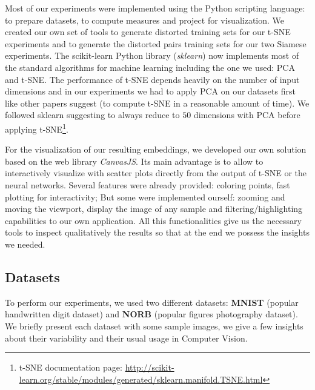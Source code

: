 \documentclass[a4paper,12pt]{report}
\begin{document}
Most of our experiments were implemented using the Python scripting language: to prepare datasets, to compute measures and project for visualization.
We created our own set of tools to generate distorted training sets for our t-SNE experiments and to generate the distorted pairs training sets for our two Siamese experiments.
The scikit-learn Python library ({\em sklearn}) now implements most of the standard algorithms for machine learning including the one we used: PCA and t-SNE\cite{pedregosa2011scikit}.
The performance of t-SNE depends heavily on the number of input dimensions and in our experiments we had to apply PCA on our datasets first like other papers suggest\cite{t-SNE} (to compute t-SNE in a reasonable amount of time).
We followed sklearn suggesting to always reduce to $50$ dimensions with PCA before applying t-SNE\footnote{t-SNE documentation page: \url{http://scikit-learn.org/stable/modules/generated/sklearn.manifold.TSNE.html}}.

For the visualization of our resulting embeddings, we developed our own solution based on the web library {\em CanvasJS}.
Its main advantage is to allow to interactively visualize with scatter plots directly from the output of t-SNE or the neural networks.
Several features were already provided: coloring points, fast plotting for interactivity; But some were implemented ourself: zooming and moving the viewport, display the image of any sample and filtering/highlighting capabilities to our own application.
All this functionalities give us the necessary tools to inspect qualitatively the results so that at the end we possess the insights we needed.

\subsection{Datasets}
To perform our experiments, we used two different datasets: {\bf MNIST}\cite{lecun1998mnist} (popular handwritten digit dataset) and {\bf NORB}\cite{lecun2004learning} (popular figures photography dataset).
We briefly present each dataset with some sample images, we give a few insights about their variability and their usual usage in Computer Vision.
\end{document}
